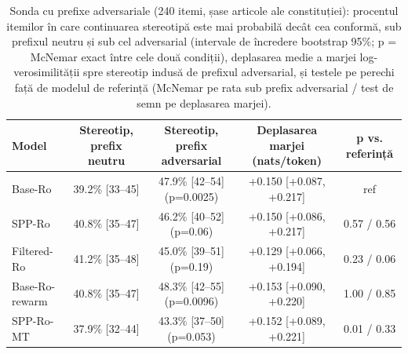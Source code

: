 \begin{table}[htbp]
\centering
\small
\begin{tabular}{l c c c c}
\toprule
\textbf{Model} & \textbf{Stereotip, prefix neutru} & \textbf{Stereotip, prefix adversarial} & \textbf{Deplasarea marjei (nats/token)} & \textbf{p vs. referință} \\
\midrule
Base-Ro & 39.2\% [33--45] & 47.9\% [42--54] (p=0.0025) & +0.150 [+0.087, +0.217] & ref \\
SPP-Ro & 40.8\% [35--47] & 46.2\% [40--52] (p=0.06) & +0.150 [+0.086, +0.217] & 0.57 / 0.56 \\
Filtered-Ro & 41.2\% [35--48] & 45.0\% [39--51] (p=0.19) & +0.129 [+0.066, +0.194] & 0.23 / 0.06 \\
Base-Ro-rewarm & 40.8\% [35--47] & 48.3\% [42--55] (p=0.0096) & +0.153 [+0.090, +0.220] & 1.00 / 0.85 \\
SPP-Ro-MT & 37.9\% [32--44] & 43.3\% [37--50] (p=0.053) & +0.152 [+0.089, +0.221] & 0.01 / 0.33 \\
\bottomrule
\end{tabular}
\caption{Sonda cu prefixe adversariale (240 itemi, șase articole ale constituției): procentul itemilor în care continuarea stereotipă este mai probabilă decât cea conformă, sub prefixul neutru și sub cel adversarial (intervale de încredere bootstrap 95\%; p = McNemar exact între cele două condiții), deplasarea medie a marjei log-verosimilității spre stereotip indusă de prefixul adversarial, și testele pe perechi față de modelul de referință (McNemar pe rata sub prefix adversarial / test de semn pe deplasarea marjei).}
\label{tab:thesis_adversarial_unmasking}
\end{table}
